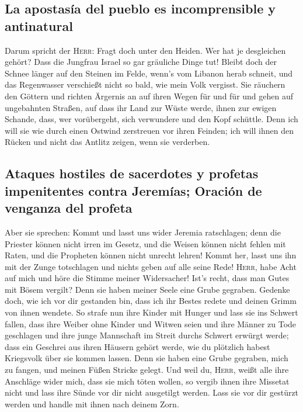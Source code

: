 \hypertarget{la-apostasuxeda-del-pueblo-es-incomprensible-y-antinatural}{%
\subsection{La apostasía del pueblo es incomprensible y
antinatural}\label{la-apostasuxeda-del-pueblo-es-incomprensible-y-antinatural}}

 Darum spricht der \textsc{Herr}: Fragt doch unter den
Heiden. Wer hat je desgleichen gehört? Dass die Jungfrau Israel so gar
gräuliche Dinge tut!  Bleibt doch der Schnee länger auf
den Steinen im Felde, wenn's vom Libanon herab schneit, und das
Regenwasser verschießt nicht so bald, wie mein Volk vergisst.
 Sie räuchern den Göttern und richten Ärgernis an auf
ihren Wegen für und für und gehen auf ungebahnten Straßen,
 auf dass ihr Land zur Wüste werde, ihnen zur ewigen
Schande, dass, wer vorübergeht, sich verwundere und den Kopf schüttle.
 Denn ich will sie wie durch einen Ostwind zerstreuen vor
ihren Feinden; ich will ihnen den Rücken und nicht das Antlitz zeigen,
wenn sie verderben.

\hypertarget{ataques-hostiles-de-sacerdotes-y-profetas-impenitentes-contra-jeremuxedas-oraciuxf3n-de-venganza-del-profeta}{%
\subsection{Ataques hostiles de sacerdotes y profetas impenitentes
contra Jeremías; Oración de venganza del
profeta}\label{ataques-hostiles-de-sacerdotes-y-profetas-impenitentes-contra-jeremuxedas-oraciuxf3n-de-venganza-del-profeta}}

 Aber sie sprechen: Kommt und lasst uns wider Jeremia
ratschlagen; denn die Priester können nicht irren im Gesetz, und die
Weisen können nicht fehlen mit Raten, und die Propheten können nicht
unrecht lehren! Kommt her, lasst uns ihn mit der Zunge totschlagen und
nichts geben auf alle seine Rede!  \textsc{Herr}, habe
Acht auf mich und höre die Stimme meiner Widersacher! 
Ist's recht, dass man Gutes mit Bösem vergilt? Denn sie haben meiner
Seele eine Grube gegraben. Gedenke doch, wie ich vor dir gestanden bin,
dass ich ihr Bestes redete und deinen Grimm von ihnen wendete.
 So strafe nun ihre Kinder mit Hunger und lass sie ins
Schwert fallen, dass ihre Weiber ohne Kinder und Witwen seien und ihre
Männer zu Tode geschlagen und ihre junge Mannschaft im Streit durchs
Schwert erwürgt werde;  dass ein Geschrei aus ihren
Häusern gehört werde, wie du plötzlich habest Kriegsvolk über sie kommen
lassen. Denn sie haben eine Grube gegraben, mich zu fangen, und meinen
Füßen Stricke gelegt.  Und weil du, \textsc{Herr}, weißt
alle ihre Anschläge wider mich, dass sie mich töten wollen, so vergib
ihnen ihre Missetat nicht und lass ihre Sünde vor dir nicht ausgetilgt
werden. Lass sie vor dir gestürzt werden und handle mit ihnen nach
deinem Zorn.

